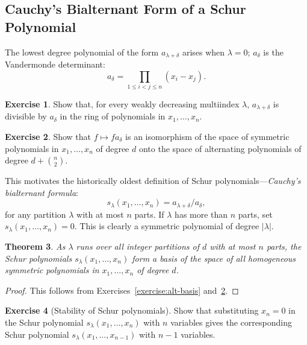 \documentclass[11pt]{amsproc}
\newtheorem{theorem}{Theorem}[subsection]
\theoremstyle{definition}
\theoremstyle{example}
\newtheorem{exercise}[theorem]{Exercise}
\begin{document}
\subsection{Cauchy's Bialternant Form of a Schur Polynomial}
\label{sec:cauchys-bialt-form}
The lowest degree polynomial of the form $a_{\lambda+\delta}$ arises when $\lambda=0$; $a_\delta$ is the Vandermonde determinant:
\begin{displaymath}
  a_\delta = \prod_{1\leq i<j\leq n}(x_i-x_j).
\end{displaymath}
\begin{exercise}
  Show that, for every weakly decreasing multiindex $\lambda$, $a_{\lambda+\delta}$ is divisible by $a_\delta$ in the ring of polynomials in $x_1,\dotsc,x_n$.
\end{exercise}
\begin{exercise}
  \label{exercise:vandermonde-iso}
  Show that $f\mapsto fa_\delta$ is an isomorphism of the space of symmetric polynomials in $x_1,\dotsc, x_n$ of degree $d$ onto the space of alternating polynomials of degree $d + \binom n2$.
\end{exercise}
This motivates the historically oldest definition of Schur polynomials---\emph{Cauchy's bialternant formula}:
\begin{equation}
  \label{eq:schur}
  s_\lambda(x_1,\dotsc,x_n) = a_{\lambda+\delta}/a_\delta,
\end{equation}
for any partition $\lambda$ with at most $n$ parts.
If $\lambda$ has more than $n$ parts, set $s_\lambda(x_1,\dotsc,x_n) =0$.
This is clearly a symmetric polynomial of degree $|\lambda|$.
\begin{theorem}
  As $\lambda$ runs over all integer partitions of $d$ with at most $n$ parts, the Schur polynomials $s_\lambda(x_1,\dotsc,x_n)$ form a basis of the space of all homogeneous symmetric polynomials in $x_1,\dotsc,x_n$ of degree $d$.
\end{theorem}
\begin{proof}
  This follows from Exercises~\ref{exercise:alt-basis} and~\ref{exercise:vandermonde-iso}.
\end{proof}
\begin{exercise}
  [Stability of Schur polynomials]
  Show that substituting $x_n=0$ in the Schur polynomial $s_\lambda(x_1,\dotsc, x_n)$ with $n$ variables gives the corresponding Schur polynomial $s_\lambda(x_1,\dotsc,x_{n-1})$ with $n-1$ variables.
\end{exercise}
\end{document}
